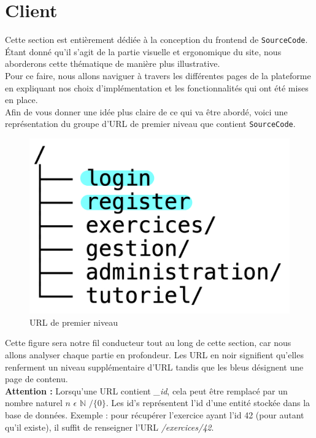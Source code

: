 \section{Client}

Cette section est entièrement dédiée à la conception du \gls{frontend} de \texttt{SourceCode}. Étant donné qu'il s'agit de la partie visuelle et ergonomique du site, nous aborderons cette thématique de manière plus illustrative.\\

Pour ce faire, nous allons naviguer à travers les différentes pages de la plateforme en expliquant nos choix d'implémentation et les fonctionnalités qui ont été mises en place.\\

Afin de vous donner une idée plus claire de ce qui va être abordé, voici une représentation du groupe d'URL de premier niveau que contient \texttt{SourceCode}.\\

\begin{figure}[H]
    \includegraphics[width=\textwidth,height=0.15\textheight,keepaspectratio]{images/client/overview_client.jpeg}
    \centering
    \caption[SourceCode : Représentation des URL de premier niveau]{URL de premier niveau}
\end{figure}

Cette figure sera notre fil conducteur tout au long de cette section, car nous allons analyser chaque partie en profondeur. 
Les URL en noir signifient qu'elles renferment un niveau supplémentaire d'URL tandis que les bleus désignent une page de contenu.\\

\textbf{Attention :} Lorsqu'une URL contient \textit{\_id}, cela peut être remplacé par un nombre naturel $ n $  $\epsilon$   $\mathbb{N}$ $/ \{0\}$. Les id's représentent l'id d'une entité stockée dans la base de données. Exemple : pour récupérer l'exercice ayant l'id 42 (pour autant qu'il existe), il suffit de renseigner l'URL \textit{/exercices/42}.\\

